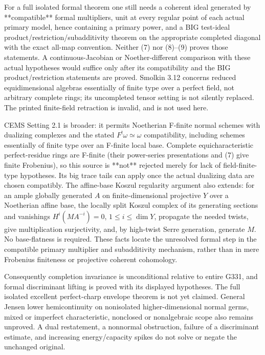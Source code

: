 \documentclass[11pt]{article}
\begin{document}
For a full isolated formal theorem one still needs a coherent ideal generated by **compatible** formal multipliers, unit at every regular point of each actual primary model, hence containing a primary power, and a BIG test-ideal product/restriction/subadditivity theorem on the appropriate completed diagonal with the exact all-map convention. Neither (7) nor (8)--(9) proves those statements. A continuous-Jacobian or Noether-different comparison with these actual hypotheses would suffice only after its compatibility and the BIG product/restriction statements are proved. Smolkin 3.12 concerns reduced equidimensional algebras essentially of finite type over a perfect field, not arbitrary complete rings; its uncompleted tensor setting is not silently replaced. The printed finite-field retraction is invalid, and is not used here.

CEMS Setting 2.1 is broader: it permits Noetherian F-finite normal schemes with dualizing complexes and the stated $F^!\omega\simeq\omega$ compatibility, including schemes essentially of finite type over an F-finite local base. Complete equicharacteristic perfect-residue rings are F-finite (their power-series presentations and (7) give finite Frobenius), so this source is **not** rejected merely for lack of field-finite-type hypotheses. Its big trace tails can apply once the actual dualizing data are chosen compatibly. The affine-base Koszul regularity argument also extends: for an ample globally generated $A$ on finite-dimensional projective $Y$ over a Noetherian affine base, the locally split Koszul complex of its generating sections and vanishings $H^i(MA^{-i})=0$, $1\le i\le\dim Y$, propagate the needed twists, give multiplication surjectivity, and, by high-twist Serre generation, generate $M$. No base-flatness is required. These facts locate the unresolved formal step in the compatible primary multiplier and subadditivity mechanism, rather than in mere Frobenius finiteness or projective coherent cohomology.

Consequently completion invariance is unconditional relative to entire G331, and formal discriminant lifting is proved with its displayed hypotheses. The full isolated excellent perfect-charp envelope theorem is not yet claimed. General Jensen lower hemicontinuity on nonisolated higher-dimensional normal germs, mixed or imperfect characteristic, nonclosed or nonalgebraic scope also remains unproved. A dual restatement, a nonnormal obstruction, failure of a discriminant estimate, and increasing energy/capacity spikes do not solve or negate the unchanged original.
\end{document}
